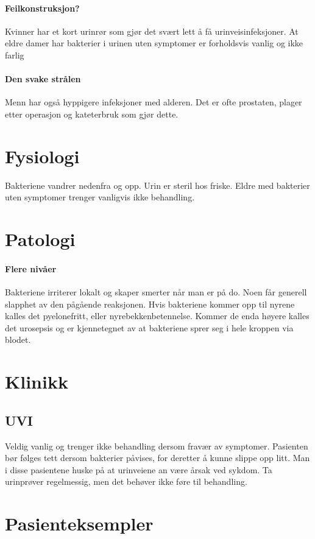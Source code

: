 			\paragraph{Feilkonstruksjon?\\}
				Kvinner har et kort urinrør som gjør det svært lett å få urinveisinfeksjoner. At eldre damer har bakterier i urinen uten symptomer er forholdsvis vanlig og ikke farlig\cite{uti-old}
			\paragraph{Den svake strålen\\}
				Menn har også hyppigere infeksjoner med alderen. Det er ofte prostaten, plager etter operasjon og kateterbruk som gjør dette. 
		\section{Fysiologi}
			Bakteriene vandrer nedenfra og opp. Urin er steril hos friske. Eldre med bakterier uten symptomer trenger vanligvis ikke behandling. 
		\section{Patologi}
			\paragraph{Flere nivåer\\}
				Bakteriene irriterer lokalt og skaper smerter når man er på do. Noen får generell slapphet av den pågående reaksjonen. Hvis bakteriene kommer opp til nyrene kalles det pyelonefritt, eller nyrebekkenbetennelse. Kommer de enda høyere kalles det urosepsis og er kjennetegnet av at bakteriene sprer seg i hele kroppen via blodet. 
		\section{Klinikk}
			\subsection{UVI}
				Veldig vanlig og trenger ikke behandling dersom fravær av symptomer. Pasienten bør følges tett dersom bakterier påvises, for deretter å kunne slippe opp litt. Man i disse pasientene huske på at urinveiene an være årsak ved sykdom. Ta urinprøver regelmessig, men det behøver ikke føre til behandling.
		\section{Pasienteksempler}
